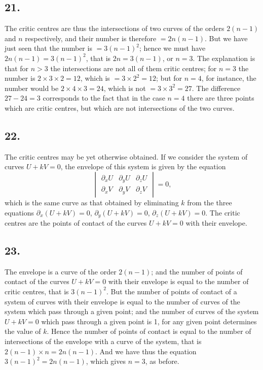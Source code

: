 \documentclass[11pt,a4paper]{article}
\theoremstyle{definition}
\begin{document}
\newpage
\subsection*{21.}

The critic centres are thus the intersections of two curves of the orders $2(n - 1)$ and
$n$ respectively, and their number is therefore $= 2n(n - 1)$. But we have just seen that
the number is $= 3(n - 1)^{2}$; hence we must have $2n(n - 1) = 3(n - 1)^{2}$, that is $2n = 3(n - 1)$,
or $n = 3$. The explanation is that for $n > 3$ the intersections are not all of them critic
centres; for $n = 3$ the number is $2 \times 3 \times 2 = 12$, which is $= 3 \times 2^{2} = 12$; but for $n = 4$, for
instance, the number would be $2 \times 4 \times 3 = 24$, which is not $= 3 \times 3^{2} = 27$. The difference
$27 - 24 = 3$ corresponds to the fact that in the case $n = 4$ there are three points which are
critic centres, but which are not intersections of the two curves.

\subsection*{22.}

The critic centres may be yet otherwise obtained. If we consider the system of curves
$U + kV = 0$, the envelope of this system is given by the equation
\[
\begin{vmatrix}
\partial_{x}U & \partial_{y}U & \partial_{z}U \\
\partial_{x}V & \partial_{y}V & \partial_{z}V
\end{vmatrix}
= 0,
\]
which is the same curve as that obtained by eliminating $k$ from the three equations
$\partial_{x}(U + kV) = 0$, $\partial_{y}(U + kV) = 0$, $\partial_{z}(U + kV) = 0$. The critic centres are the points of
contact of the curves $U + kV = 0$ with their envelope.

\subsection*{23.}

The envelope is a curve of the order $2(n - 1)$; and the number of points of contact of
the curves $U + kV = 0$ with their envelope is equal to the number of critic centres, that
is $3(n - 1)^{2}$. But the number of points of contact of a system of curves with their envelope
is equal to the number of curves of the system which pass through a given point; and
the number of curves of the system $U + kV = 0$ which pass through a given point is
1, for any given point determines the value of $k$. Hence the number of points of contact
is equal to the number of intersections of the envelope with a curve of the system, that
is $2(n - 1) \times n = 2n(n - 1)$. And we have thus the equation $3(n - 1)^{2} = 2n(n - 1)$, which gives
$n = 3$, as before.
\end{document}
